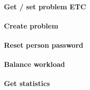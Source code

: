 \paragraph{Get / set problem ETC }

\paragraph{Create problem }

\paragraph{Reset person password}

\paragraph{Balance workload}

\paragraph{Get statistics	}


